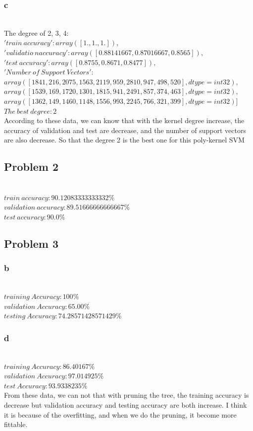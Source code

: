 \documentclass[12pt]{article}
\begin{document}
            \subsubsection{c}
\\ The degree of 2, 3, 4:
\\$'train\ accuracy': array([1., 1., 1.]),$
\\$'validatio\ naccuracy': array ([0.88141667, 0.87016667, 0.8565]),$
\\$'test\ accuracy': array ([0.8755, 0.8671, 0.8477]),$
\\$'Number\ of\ Support\ Vectors': $
\\$array([1841,  216, 2075, 1563, 2119,  959, 2810,  947,  498,  520], dtype=int32),$
\\$array([1539,  169, 1720, 1301, 1815,  941, 2491,  857,  374,  463], dtype=int32),$
\\$array([1362,  149, 1460, 1148, 1556,  993, 2245,  766,  321,  399], dtype=int32)]$
\\ $The\ best\ degree: 2$
\\ According to these data, we can know that with the kernel degree increase, the accuracy of 
validation and test are decrease, and the number of support vectors are also decrease. So that 
the degree 2 is the best one for this poly-kernel SVM
        \subsection{Problem 2}
\\$train\ accuracy: 90.12083333333332 \%$
\\$validation\ accuracy: 89.51666666666667 \%$
\\$test\ accuracy: 90.0 \%$
        \subsection{Problem 3}
            \subsubsection{b}
\\$training\ Accuracy: 100\%$
\\$validation\ Accuracy: 65.00\%$
\\$testing\ Accuracy: 74.28571428571429\%$
            \subsubsection{d}
\\$training\ Accuracy: 86.40167\%$
\\$validation\ Accuracy: 97.014925\%$
\\$test\ Accuracy: 93.9338235\%$
\\ From these data, we can not that with pruning the tree, the training accuracy is decrease 
but validation accuracy and testing accuracy are both increase. I think it is because of the 
overfitting, and when we do the pruning, it become more fittable.
\end{document}

